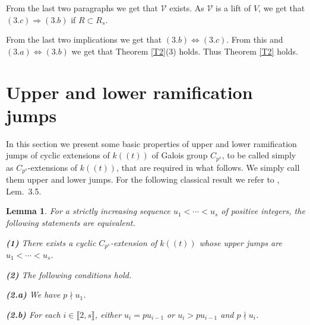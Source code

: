 \documentclass[11pt]{amsart}
\newtheorem{lemma}[theorem]{Lemma}
\begin{document}
From the last two paragraphs we get that $\mathcal V$ exists. As $\mathcal V$ is a lift of $V$, we get that $(3.c)\Rightarrow (3.b)$ if $R\subset R_s$.

From the last two implications we get that $(3.b)\Leftrightarrow (3.c)$. From this and $(3.a)\Leftrightarrow (3.b)$ we get that Theorem \ref{T2}(3) holds. Thus Theorem \ref{T2} holds.

\section{Upper and lower ramification jumps}\label{S9}

In this section we present some basic properties of upper and lower ramification jumps of cyclic extensions of $k((t))$ of Galois group $C_{p^s}$, to be called simply as $C_{p^s}$-extensions of $k((t))$, that are required in what follows. We simply call them upper and lower jumps. For the following classical result we refer to \cite{OP}, Lem.\ 3.5.

\begin{lemma}\label{L7}
For a strictly increasing sequence $u_1<\cdots<u_s$ of positive integers, the following statements are equivalent.

\medskip
{\bf (1)} There exists a cyclic $C_{p^s}$-extension of $k((t))$ whose upper jumps are $u_1<\cdots<u_s$.

\smallskip
{\bf (2)} The following conditions hold.

\medskip\noindent
{\bf (2.a)} We have $p\nmid u_1$.

\smallskip\noindent
{\bf (2.b)} For each $i\in\llbracket2,s\rrbracket$, either $u_i=pu_{i-1}$ or $u_i>pu_{i-1}$ and $p\nmid u_i$.
\end{lemma}
\end{document}
